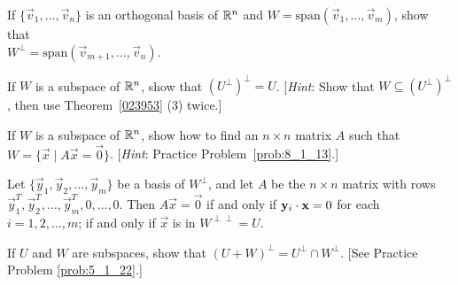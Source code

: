 \documentclass{ximera}
\begin{document}
\begin{problem}\label{prob:8_1_12}
If $\{\vec{v}_{1}, \dots, \vec{v}_{n}\}$ is an orthogonal basis of $\mathbb{R}^n$ and $W = \mbox{span}\left(\vec{v}_{1}, \dots, \vec{v}_{m}\right)$, show that \\ $W^\perp = \mbox{span}\left(\vec{v}_{m + 1}, \dots, \vec{v}_{n}\right)$.
\end{problem}

\begin{problem}\label{prob:8_1_13}
If $W$ is a subspace of $\mathbb{R}^n$, show that $\left(U^{\perp}\right)^\perp = U$. [\textit{Hint}: Show that $W \subseteq \left(U^{\perp}\right)^\perp$, then use Theorem~\ref{023953} (3) twice.]
\end{problem}

\begin{problem}\label{prob:8_1_14}
If $W$ is a subspace of $\mathbb{R}^n$, show how to find an $n \times n$ matrix $A$ such that $W = \{\vec{x} \mid A\vec{x} = \vec{0}\}$. [\textit{Hint}: Practice Problem~\ref{prob:8_1_13}.]

\begin{hint}
Let $\{\vec{y}_{1}, \vec{y}_{2}, \dots, \vec{y}_{m}\}$ be a basis of $W^\perp$, and let $A$ be the $n \times n$ matrix with rows $\vec{y}^T_1, \vec{y}^T_2, \dots, \vec{y}^T_m, 0, \dots, 0$. Then $A\vec{x} = \vec{0}$ if and only if $\mathbf{y}_{i} \cdot \mathbf{x} = 0$ for each $i = 1, 2, \dots, m$; if and only if $\vec{x}$ is in $W^{\perp \perp} = U$.
\end{hint}
\end{problem}

\begin{problem}\label{prob:8_1_16}
If $U$ and $W$ are subspaces, show that $(U + W)^\perp = U^\perp \cap W^\perp$. [See Practice Problem \ref{prob:5_1_22}.]
\end{problem}
\end{document}
